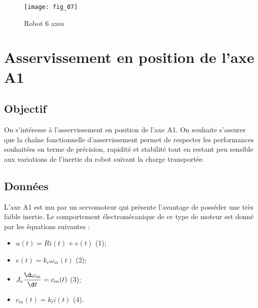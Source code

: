 





\begin{figure}[!h]
\centering
\texttt{[image: fig\_07]}
\caption{Robot 6 axes \label{kuka:fig:07}}
\end{figure}



\section{Asservissement en position de l'axe A1}

\subsection{Objectif}
On s’intéresse à l’asservissement en position de l’axe A1. On souhaite s’assurer que la chaîne 
fonctionnelle d’asservissement permet de respecter les performances souhaitées en terme de 
précision, rapidité et stabilité tout en restant peu sensible aux variations de l’inertie du robot 
suivant la charge transportée. 

\subsection{Données \label{sec:6:2}} 
L’axe A1 est mu par un servomoteur qui présente l'avantage de posséder une très faible 
inertie. Le comportement électromécanique de ce type de moteur est donné par les équations 
suivantes : 
\begin{itemize}%
\item $u(t) = Ri(t) + e(t)$ (1);
\item $e(t) = k_e \omega_m(t)$  (2);
\item $J_e \dfrac{\d \omega_m}{\d t} = c_m(t)$ (3);
\item $c_m(t) = k_t i(t)$ (4).
\end{itemize}

